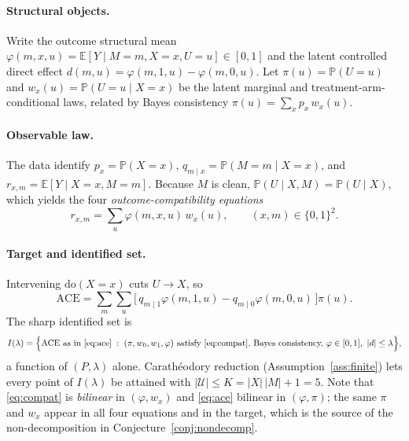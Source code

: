 \documentclass[11pt]{article}
\newcommand{\E}{\mathbb{E}}
\renewcommand{\Pr}{\mathbb{P}}
\theoremstyle{definition}
\theoremstyle{plain}
\theoremstyle{remark}
\begin{document}
\paragraph{Structural objects.} Write the outcome structural mean
$\varphi(m,x,u)=\E[Y\mid M=m,X=x,U=u]\in[0,1]$ and the latent controlled direct effect
$d(m,u)=\varphi(m,1,u)-\varphi(m,0,u)$. Let $\pi(u)=\Pr(U=u)$ and $w_x(u)=\Pr(U=u\mid X=x)$ be the latent
marginal and treatment-arm-conditional laws, related by Bayes consistency $\pi(u)=\sum_x p_x\,w_x(u)$.

\paragraph{Observable law.} The data identify $p_x=\Pr(X=x)$, $q_{m\mid x}=\Pr(M=m\mid X=x)$, and
$r_{x,m}=\E[Y\mid X=x,M=m]$. Because $M$ is clean, $\Pr(U\mid X,M)=\Pr(U\mid X)$, which yields the four
\emph{outcome-compatibility equations}
\begin{equation}\label{eq:compat}
  r_{x,m}=\sum_{u}\varphi(m,x,u)\,w_x(u),\qquad (x,m)\in\{0,1\}^2 .
\end{equation}

\paragraph{Target and identified set.} Intervening $\mathrm{do}(X=x)$ cuts $U\to X$, so
\begin{equation}\label{eq:ace}
  \mathrm{ACE}=\sum_{m}\sum_{u}\bigl[\,q_{m\mid1}\varphi(m,1,u)-q_{m\mid0}\varphi(m,0,u)\,\bigr]\pi(u).
\end{equation}
The sharp identified set is
\begin{equation}\label{eq:idset}
  I(\lambda)=\Bigl\{\mathrm{ACE}\text{ as in \eqref{eq:ace}}\;:\;
   (\pi,w_0,w_1,\varphi)\text{ satisfy \eqref{eq:compat}, Bayes consistency, }
   \varphi\in[0,1],\ |d|\le\lambda\Bigr\},
\end{equation}
a function of $(P,\lambda)$ alone. Carath\'eodory reduction (Assumption~\ref{ass:finite}) lets every point
of $I(\lambda)$ be attained with $|\mathcal U|\le K=|X|\,|M|+1=5$. Note that \eqref{eq:compat} is
\emph{bilinear} in $(\varphi,w_x)$ and \eqref{eq:ace} bilinear in $(\varphi,\pi)$; the same $\pi$ and
$w_x$ appear in all four equations and in the target, which is the source of the non-decomposition in
Conjecture~\ref{conj:nondecomp}.
\end{document}
